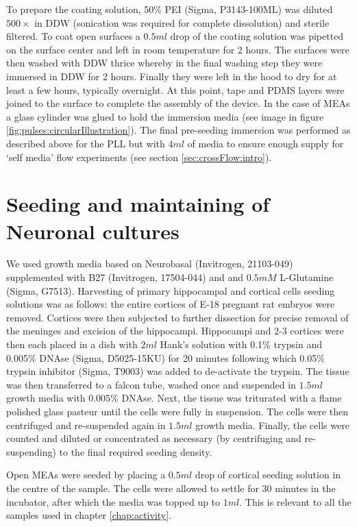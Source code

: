        To prepare the coating solution, 50\% PEI (Sigma, P3143-100ML) was diluted \(500\times\) in DDW (sonication was required for complete dissolution) and sterile filtered. To coat open surfaces a \(0.5ml\) drop of the coating solution was pipetted on the surface center and left in room temperature for 2 hours. The surfaces were then washed with DDW thrice whereby in the final washing step they were immersed in DDW for 2 hours. Finally they were left in the hood to dry for at least a few hours, typically overnight. At this point, tape and PDMS layers were joined to the surface to complete the assembly of the device. In the case of MEAs a glass cylinder was glued to hold the immersion media (see image in figure \ref{fig:pulses:circularIllustration}). The final pre-seeding immersion was performed as described above for the PLL but with \(4ml\) of media to ensure enough supply for `self media' flow experiments (see section \ref{sec:crossFlow:intro}).

 \section{Seeding and maintaining of Neuronal cultures}
 We used growth media based on Neurobasal (Invitrogen, 21103-049) supplemented with B27 (Invitrogen, 17504-044) and and \(0.5mM\) L-Glutamine  (Sigma, G7513). Harvesting of primary hippocampal and cortical cells seeding solutions was as follows: the entire cortices of E-18 pregnant rat embryos were removed. Cortices were then subjected to further dissection for precise removal of the meninges and excision of the hippocampi. Hippocampi and 2-3 cortices were then each placed in a dish with \(2ml\) Hank's solution with 0.1\% trypsin and 0.005\% DNAse (Sigma, D5025-15KU) for 20 minutes following which 0.05\% trypsin inhibitor (Sigma, T9003) was added to de-activate the trypsin. The tissue was then transferred to a falcon tube, washed once and suspended in \(1.5ml\) growth media with 0.005\% DNAse. Next, the tissue was triturated with a flame polished glass pasteur until the cells were fully in suspension. The cells were then centrifuged and re-suspended again in \(1.5ml\) growth media. Finally, the cells were counted and diluted or concentrated as necessary (by centrifuging and re-suspending) to the final required seeding density.

 Open MEAs were seeded by placing a \(0.5ml\) drop of cortical seeding solution in the centre of the sample. The cells were allowed to settle for 30 minutes in the incubator, after which the media was topped up to \(1ml\). This is relevant to all the samples used in chapter \ref{chap:activity}.

